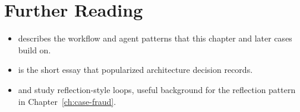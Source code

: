 \section*{Further Reading}

\begin{itemize}[itemsep=2pt]
  \item \citet{anthropic2024effective} describes the workflow and agent patterns that this chapter and later cases build on.
  \item \citet{nygard2011adr} is the short essay that popularized architecture decision records.
  \item \citet{madaan2023selfrefine} and \citet{shinn2023reflexion} study reflection-style loops, useful background for the reflection pattern in Chapter~\ref{ch:case-fraud}.
\end{itemize}
